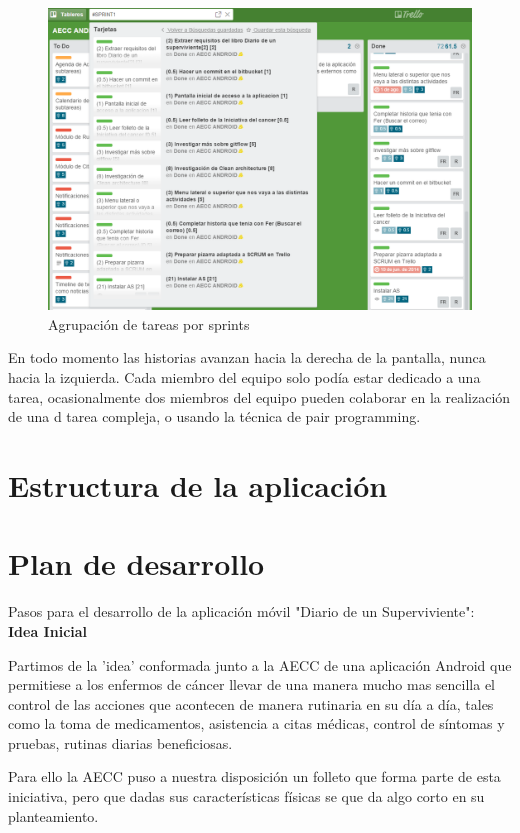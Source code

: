 \documentclass[../pfc.tex]{subfiles}
\begin{document}
		\begin{figure}[H]
			\centering
			\includegraphics[width=1\linewidth]{../images/sprints2}
			\caption{Agrupación de tareas por sprints}
			\label{fig:sprints}
		\end{figure}

En todo momento las historias avanzan hacia la derecha de la pantalla, nunca hacia la izquierda. Cada miembro del equipo solo podía estar dedicado a una tarea, ocasionalmente dos miembros del equipo pueden colaborar en la realización de una d
tarea compleja, o usando la técnica de pair programming. 
	
	\section{Estructura de la aplicación}
	
	\section{Plan de desarrollo}
	Pasos para el desarrollo de la aplicación móvil "Diario de un Superviviente":\\
	
	\textbf{Idea Inicial}
	
	Partimos de la 'idea' conformada junto a la AECC de una aplicación Android  que permitiese a los enfermos de cáncer llevar de una manera mucho mas sencilla el control de las acciones que acontecen de manera rutinaria en su día a día, tales como la toma de medicamentos, asistencia a citas médicas, control de síntomas y pruebas, rutinas diarias beneficiosas.
	
	Para ello la AECC puso a nuestra disposición un folleto que forma parte de esta iniciativa, pero que dadas sus características físicas se que da algo corto en su planteamiento.\\
	
\end{document}
